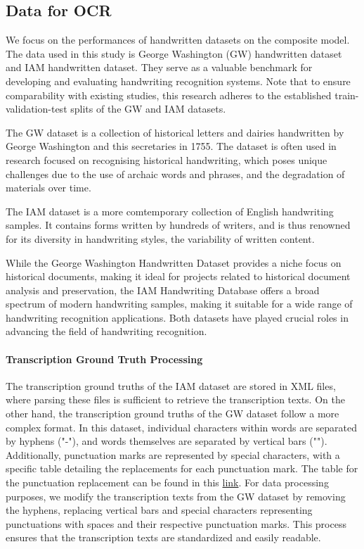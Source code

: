 \subsection{Data for OCR} 
\label{subsec:3_data_for_ocr}
We focus on the performances of handwritten datasets on the composite model. The data used in this study is George Washington (GW) handwritten dataset and IAM handwritten dataset. They serve as a valuable benchmark for developing and evaluating handwriting recognition systems. Note that to ensure comparability with existing studies, this research adheres to the established train-validation-test splits of the GW and IAM datasets. 

The GW dataset is a collection of historical letters and dairies handwritten by George Washington and this secretaries in 1755. The dataset is often used in research focused on recognising historical handwriting, which poses unique challenges due to the use of archaic words and phrases, and the degradation of materials over time.

The IAM dataset is a more comtemporary collection of English handwriting samples. It contains forms written by hundreds of writers, and is thus renowned for its diversity in handwriting styles, the variability of written content. 

While the George Washington Handwritten Dataset provides a niche focus on historical documents, making it ideal for projects related to historical document analysis and preservation, the IAM Handwriting Database offers a broad spectrum of modern handwriting samples, making it suitable for a wide range of handwriting recognition applications. Both datasets have played crucial roles in advancing the field of handwriting recognition. 
\paragraph*{Transcription Ground Truth Processing}
\label{par:3_transcription_gound_truth_processing}
The transcription ground truths of the IAM dataset are stored in XML files, where parsing these files is sufficient to retrieve the transcription texts. On the other hand, the transcription ground truths of the GW dataset follow a more complex format. In this dataset, individual characters within words are separated by hyphens ("-"), and words themselves are separated by vertical bars ("\textbar"). Additionally, punctuation marks are represented by special characters, with a specific table detailing the replacements for each punctuation mark. The table for the punctuation replacement can be found in this \href{https://github.com/Yung-Hsin-Chen/master_thesis/blob/src/model/config/punctuation_list.json}{link}. 
For data processing purposes, we modify the transcription texts from the GW dataset by removing the hyphens, replacing vertical bars and special characters representing punctuations with spaces and their respective punctuation marks. This process ensures that the transcription texts are standardized and easily readable. 
